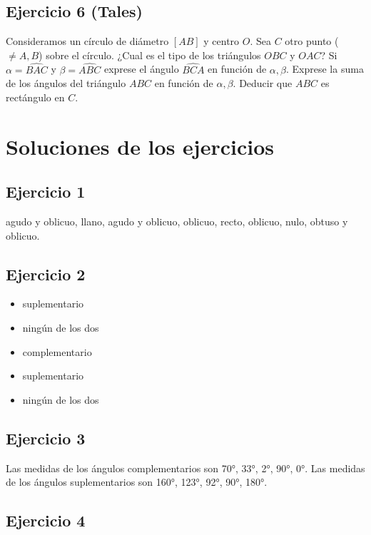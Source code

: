 \subsection{Ejercicio 6 (Tales)}

Consideramos un círculo de diámetro $[AB]$ y centro $O$. Sea $C$ otro punto
($\neq A,B$) sobre el círculo. ¿Cual es el tipo de los triángulos $OBC$ y
$OAC$? Si $\alpha = \widehat{BAC}$ y $\beta = \widehat{ABC}$ exprese el
ángulo $\widehat{BCA}$ en función de $\alpha, \beta$. Exprese la
suma de los ángulos del triángulo $ABC$ en función de $\alpha, \beta$. Deducir
que $ABC$ es rectángulo en $C$.

\section{Soluciones de los ejercicios}

\subsection*{Ejercicio 1}

agudo y oblicuo, llano, agudo y oblicuo, oblicuo, recto, oblicuo, nulo, obtuso y
oblicuo.

\subsection*{Ejercicio 2}

\begin{itemize}
  \item suplementario
  \item ningún de los dos
  \item complementario
  \item suplementario
  \item ningún de los dos
\end{itemize}

\subsection*{Ejercicio 3}

Las medidas de los ángulos complementarios son 70°, 33°, 2°, 90°, 0°.
Las medidas de los ángulos suplementarios son 160°, 123°, 92°, 90°, 180°.

\subsection*{Ejercicio 4}

